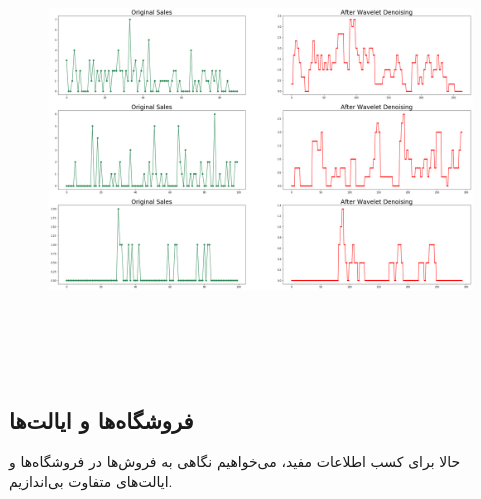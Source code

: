 \documentclass{article}
\begin{document}
\begin{figure}[hbt!]
	\centering
	\includegraphics[width=\textwidth,height=10cm]{Outputs/11.png}
\end{figure}
\ \\
\subsection*{فروشگاه‌ها و ایالت‌ها}
حالا برای کسب اطلاعات مفید، می‌خواهیم نگاهی به فروش‌ها در فروشگاه‌ها و ایالت‌های متفاوت بی‌اندازیم.
\end{document}
